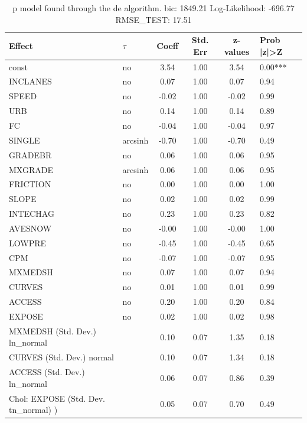 \begin{table}
	\caption{p model found through the de algorithm. bic: 1849.21 Log-Likelihood: -696.77 RMSE_TEST: 17.51}
	\begin{center}
		\begin{tabular}{|l|l|c|c|c|l|}
			\hline
			Effect & $\tau$ & Coeff & Std. Err & z-values & Prob |z|>Z \\
			\hline
			const & no & 3.54 & 1.00 & 3.54 & 0.00*** \\
			\hline
			INCLANES & no & 0.07 & 1.00 & 0.07 & 0.94 \\
			\hline
			SPEED & no & -0.02 & 1.00 & -0.02 & 0.99 \\
			\hline
			URB & no & 0.14 & 1.00 & 0.14 & 0.89 \\
			\hline
			FC & no & -0.04 & 1.00 & -0.04 & 0.97 \\
			\hline
			SINGLE & arcsinh & -0.70 & 1.00 & -0.70 & 0.49 \\
			\hline
			GRADEBR & no & 0.06 & 1.00 & 0.06 & 0.95 \\
			\hline
			MXGRADE & arcsinh & 0.06 & 1.00 & 0.06 & 0.95 \\
			\hline
			FRICTION & no & 0.00 & 1.00 & 0.00 & 1.00 \\
			\hline
			SLOPE & no & 0.02 & 1.00 & 0.02 & 0.99 \\
			\hline
			INTECHAG & no & 0.23 & 1.00 & 0.23 & 0.82 \\
			\hline
			AVESNOW & no & -0.00 & 1.00 & -0.00 & 1.00 \\
			\hline
			LOWPRE & no & -0.45 & 1.00 & -0.45 & 0.65 \\
			\hline
			CPM & no & -0.07 & 1.00 & -0.07 & 0.95 \\
			\hline
			MXMEDSH & no & 0.07 & 1.00 & 0.07 & 0.94 \\
			\hline
			CURVES & no & 0.01 & 1.00 & 0.01 & 0.99 \\
			\hline
			ACCESS & no & 0.20 & 1.00 & 0.20 & 0.84 \\
			\hline
			EXPOSE & no & 0.02 & 1.00 & 0.02 & 0.98 \\
			\hline
			MXMEDSH (Std. Dev.) ln_normal &  & 0.10 & 0.07 & 1.35 & 0.18 \\
			\hline
			CURVES (Std. Dev.) normal &  & 0.10 & 0.07 & 1.34 & 0.18 \\
			\hline
			ACCESS (Std. Dev.) ln_normal &  & 0.06 & 0.07 & 0.86 & 0.39 \\
			\hline
			 Chol: EXPOSE (Std. Dev. tn_normal) ) &  & 0.05 & 0.07 & 0.70 & 0.49 \\
			\hline
		\end{tabular}
	\end{center}
\end{table}